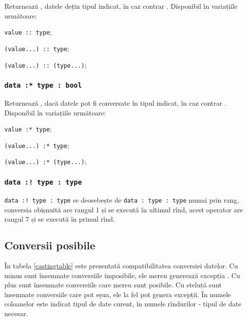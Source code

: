 Returnează \true, datele dețin tipul indicat, în caz contrar \false. Disponibil în variațiile următoare:
\begin{icItems}
	\item \lstinline|value :: type|;
	\item \lstinline|(value...) :: type|;
	\item \lstinline|(value...) :: (type...)|;
\end{icItems}

\subsubsection{\lstinline|data :* type : bool|}

Returnează \true, dacă datele pot fi conversate în tipul indicat, în caz contrar \false. Disponibil în variațiile următoare:
\begin{icItems}
	\item \lstinline|value :* type|;
	\item \lstinline|(value...) :* type|;
	\item \lstinline|(value...) :* (type...)|;
\end{icItems}

\subsubsection{\lstinline|data :! type : type|}

\lstinline|data :! type : type| se deosebește de \lstinline|data : type : type| numai prin rang, conversia obișnuită are rangul 1 și se execută în ultimul  rînd, acest operator are rangul 7 și se execută în primul rînd.

\subsection{Conversii posibile}

În tabela \ref{castingtable} este prezentată compatibilitatea conversiei datelor. Cu minus sunt însemnate conversiile imposibile, ele mereu generează excepția . Cu plus sunt însemnate conversiile care mereu sunt posibile. Cu steluță sunt însemnate conversiile care pot eșua, ele la fel pot genera excepții. În numele coloanelor este indicat tipul de date curent, în numele rîndurilor - tipul de date necesar.


